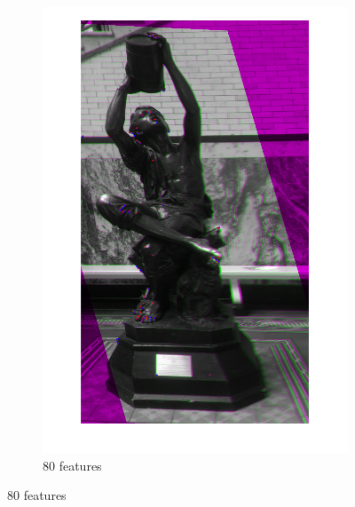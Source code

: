 \documentclass{article}
\begin{document}
\begin{figure}[h]
\begin{subfigure}[b]{0.3\textwidth}
		\includegraphics[width=\textwidth]{figures/alignment/fused_80_features_16_iterations}
		\caption{80 features}
	\end{subfigure}


\end{figure}
\end{document}
